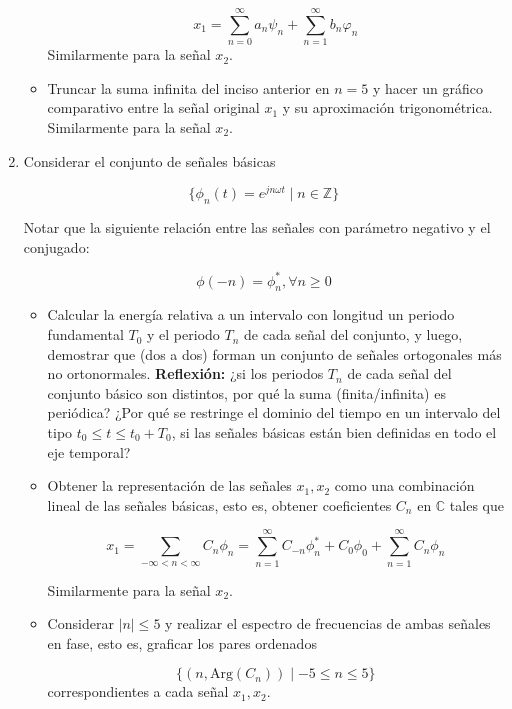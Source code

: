 \documentclass[12pt,a4paper]{report}
\begin{document}
\begin{enumerate}[label=\alph*),left=0pt]
\begin{itemize}[left=0pt]
     $$x_1 = \sum_{n=0}^{\infty} a_n \psi_n + \sum_{n=1}^{\infty} b_n \varphi_n$$
     Similarmente para la señal $x_2$.

   \item Truncar la suma infinita del inciso anterior en $n = 5$ y hacer un gráfico comparativo entre la señal 
     original $x_1$ y su aproximación trigonométrica. Similarmente para la señal $x_2$.

  \end{itemize}

  \item Considerar el conjunto de señales básicas

  $$\{\phi_n(t) = e^{jn\omega t} \mid n \in \mathbb{Z}\}$$

  Notar que la siguiente relación entre las señales con parámetro negativo y el conjugado:

  $$\phi(-n) = \phi_n^*, \forall n \geq 0$$

  \begin{itemize}[left=0pt]

    \item Calcular la energía relativa a un intervalo con longitud un periodo fundamental $T_0$ y el periodo $T_n$ de
      cada señal del conjunto, y luego, demostrar que (dos a dos) forman un conjunto de señales ortogonales más no
      ortonormales.\newline
      \textbf{Reflexión:} ¿si los periodos $T_n$ de cada señal del conjunto básico son distintos, por qué la suma
      (finita/infinita) es periódica? ¿Por qué se restringe el dominio del tiempo en un intervalo del tipo 
      $t_0 \leq t \leq t_0 + T_0$, si las señales básicas están bien definidas en todo el eje temporal?

    \item Obtener la representación de las señales $x_1, x_2$ como una combinación lineal de las señales básicas, esto 
      es, obtener coeficientes $C_n$ en $\mathbb{C}$ tales que

      $$x_1 = \sum_{-\infty < n < \infty} C_n \phi_n =
      \sum_{n=1}^{\infty} C_{-n} \phi_n^* + C_0 \phi_0 + \sum_{n=1}^{\infty} C_n \phi_n$$

      Similarmente para la señal $x_2$.

    \item Considerar $|n| \leq 5$ y realizar el espectro de frecuencias de ambas señales en fase, esto es, graficar los 
      pares ordenados

      $$\{(n, \text{Arg}(C_n)) \mid -5 \leq n \leq 5\}$$
      correspondientes a cada señal $x_1, x_2$.


\end{itemize}
\end{enumerate}
\end{document}
